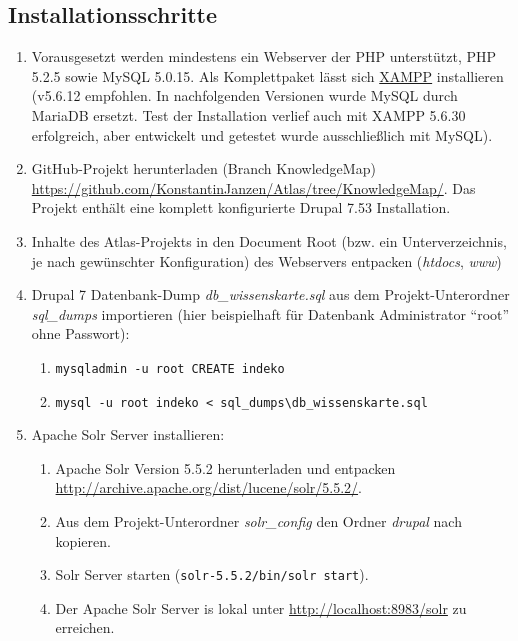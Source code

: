 \subsection{Installationsschritte}
\begin{enumerate}
	\item Vorausgesetzt werden mindestens ein Webserver der PHP unterstützt, PHP 5.2.5 sowie MySQL 5.0.15. Als Komplettpaket lässt sich \zB \href{https://www.apachefriends.org/de/download.html}{XAMPP} installieren (v5.6.12 empfohlen. In nachfolgenden Versionen wurde MySQL durch MariaDB ersetzt. Test der Installation verlief auch mit XAMPP 5.6.30 erfolgreich, aber entwickelt und getestet wurde ausschließlich mit MySQL).

	\item GitHub-Projekt herunterladen (Branch KnowledgeMap) \url{https://github.com/KonstantinJanzen/Atlas/tree/KnowledgeMap/}.
	Das Projekt enthält eine komplett konfigurierte Drupal 7.53 Installation.

	\item Inhalte des Atlas-Projekts in den Document Root (bzw. ein Unterverzeichnis, je nach gewünschter Konfiguration) des Webservers entpacken (\zB \textit{htdocs}, \textit{www})

	\item Drupal 7 Datenbank-Dump \textit{db\_wissenskarte.sql} aus dem Projekt-Unterordner \textit{sql\_dumps} importieren (hier beispielhaft für Datenbank Administrator \enquote{root} ohne Passwort):
	\begin{enumerate}
		\item \lstinline|mysqladmin -u root CREATE indeko|

		\item \lstinline|mysql -u root indeko < sql_dumps\db_wissenskarte.sql|
	\end{enumerate}

	\item Apache Solr Server installieren:
	\begin{enumerate}
		\item Apache Solr Version 5.5.2 herunterladen und entpacken \url{http://archive.apache.org/dist/lucene/solr/5.5.2/}.

		\item Aus dem Projekt-Unterordner \textit{solr\_config} den Ordner \textit{drupal} nach  kopieren.

		\item Solr Server starten (\zB \lstinline|solr-5.5.2/bin/solr start|).
		\item Der Apache Solr Server is lokal unter \url{http://localhost:8983/solr} zu erreichen.
	\end{enumerate}


\end{enumerate}
